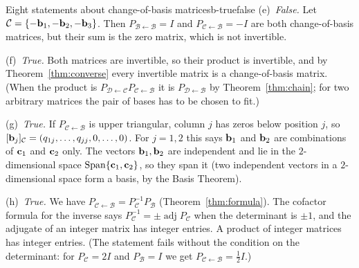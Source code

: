\documentclass[11pt]{article}
\begin{document}
\begin{exmp}{Eight statements about change-of-basis matrices}{b-truefalse}
(e)~\emph{False.} Let $\mathcal{C}=\{-\mathbf{b}_1,-\mathbf{b}_2,-\mathbf{b}_3\}$. Then $P_{\mathcal{B}\leftarrow\mathcal{B}}=I$ and $P_{\mathcal{C}\leftarrow\mathcal{B}}=-I$ are both change-of-basis matrices, but their sum is the zero matrix, which is not invertible.

(f)~\emph{True.} Both matrices are invertible, so their product is invertible, and by Theorem~\ref{thm:converse} every invertible matrix is a change-of-basis matrix. (When the product is $P_{\mathcal{D}\leftarrow\mathcal{C}}P_{\mathcal{C}\leftarrow\mathcal{B}}$ it is $P_{\mathcal{D}\leftarrow\mathcal{B}}$ by Theorem~\ref{thm:chain}; for two arbitrary matrices the pair of bases has to be chosen to fit.)

(g)~\emph{True.} If $P_{\mathcal{C}\leftarrow\mathcal{B}}$ is upper triangular, column $j$ has zeros below position $j$, so $[\mathbf{b}_j]_{\mathcal{C}}=(q_{1j},\dots,q_{jj},0,\dots,0)$. For $j=1,2$ this says $\mathbf{b}_1$ and $\mathbf{b}_2$ are combinations of $\mathbf{c}_1$ and $\mathbf{c}_2$ only. The vectors $\mathbf{b}_1,\mathbf{b}_2$ are independent and lie in the $2$-dimensional space $\operatorname{Span}\{\mathbf{c}_1,\mathbf{c}_2\}$, so they span it (two independent vectors in a $2$-dimensional space form a basis, by the Basis Theorem).

(h)~\emph{True.} We have $P_{\mathcal{C}\leftarrow\mathcal{B}}=P_{\mathcal{C}}^{-1}P_{\mathcal{B}}$ (Theorem~\ref{thm:formula}). The cofactor formula for the inverse says $P_{\mathcal{C}}^{-1}=\pm\operatorname{adj}P_{\mathcal{C}}$ when the determinant is $\pm1$, and the adjugate of an integer matrix has integer entries. A product of integer matrices has integer entries. (The statement fails without the condition on the determinant: for $P_{\mathcal{C}}=2I$ and $P_{\mathcal{B}}=I$ we get $P_{\mathcal{C}\leftarrow\mathcal{B}}=\tfrac12I$.)

\end{exmp}
\end{document}
